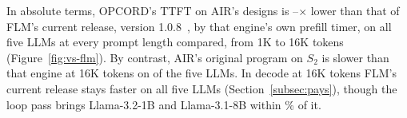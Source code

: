 In absolute terms, OPCORD's TTFT on AIR's designs is \AbsGainLo--\AbsGainHi$\times$ lower than that of FLM's current release, version 1.0.8~\citep{fastflowlm-repo}, by that engine's own prefill timer, on all five LLMs at every prompt length compared, from 1K to 16K tokens (Figure~\ref{fig:vs-flm}).
By contrast, AIR's original program on $S_2$ is slower than that engine at 16K tokens on \AbsOrigSlower{} of the five LLMs.
In decode at 16K tokens FLM's current release stays faster on all five LLMs (Section~\ref{subsec:pays}), though the loop pass brings Llama-3.2-1B and Llama-3.1-8B within \AbsDecodeClosePct\% of it.

